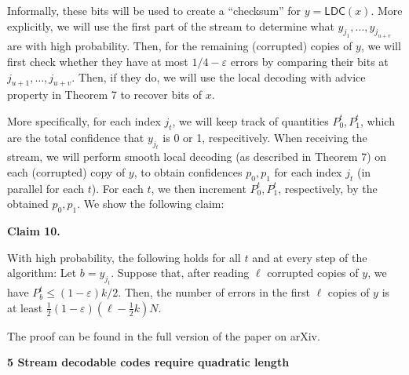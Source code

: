 \documentclass[10pt,a4paper]{article}
\begin{document}
Informally, these bits will be used to create a “checksum” for $y=\mathsf{LDC}(x)$. More explicitly, we will use the first part of the stream to determine what $y_{j_{1}},\dots,y_{j_{u+v}}$ are with high probability. Then, for the remaining (corrupted) copies of $y$, we will first check whether they have at most $1/4-\varepsilon$ errors by comparing their bits at $j_{u+1},\dots,j_{u+v}$. Then, if they do, we will use the local decoding with advice property in Theorem 7 to recover bits of $x$.\par




More specifically, for each index $j_{t}$, we will keep track of quantities $P_{0}^{t},P_{1}^{t}$, which are the total confidence that $y_{j_{t}}$ is 0 or 1, respecitively. When receiving the stream, we will perform smooth local decoding (as described in Theorem 7) on each (corrupted) copy of $y$, to obtain confidences $p_{0},p_{1}$ for each index $j_{t}$ (in parallel for each $t$). For each $t$, we then increment $P_{0}^{t},P_{1}^{t}$, respectively, by the obtained $p_{0},p_{1}$. We show the following claim:\par





\par\medskip\noindent\textbf{
Claim 10. 
}\par



With high probability, the following holds for all $t$ and at every step of the algorithm: Let $b=y_{j_{t}}$. Suppose that, after reading $\ell$ corrupted copies of $y$, we have $P_{b}^{t}\leq(1-\varepsilon)k/2$. Then, the number of errors in the first $\ell$ copies of $y$ is at least $\frac{1}{2}(1-\varepsilon)(\ell-\frac{1}{2}k)N$.\par






The proof can be found in the full version of the paper on arXiv.\par





\par\medskip\noindent\textbf{
5 Stream decodable codes require quadratic length}\par
\end{document}
